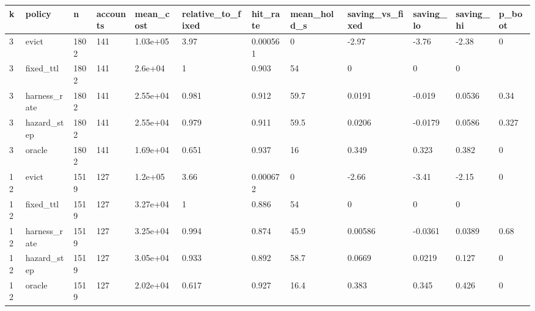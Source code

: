 \begin{tabular}{llllllllllll}
\toprule
k & policy & n & accounts & mean\_cost & relative\_to\_fixed & hit\_rate & mean\_hold\_s & saving\_vs\_fixed & saving\_lo & saving\_hi & p\_boot \\
\midrule
3 & evict & 1802 & 141 & 1.03e+05 & 3.97 & 0.000561 & 0 & -2.97 & -3.76 & -2.38 & 0 \\
3 & fixed\_ttl & 1802 & 141 & 2.6e+04 & 1 & 0.903 & 54 & 0 & 0 & 0 &  \\
3 & harness\_rate & 1802 & 141 & 2.55e+04 & 0.981 & 0.912 & 59.7 & 0.0191 & -0.019 & 0.0536 & 0.34 \\
3 & hazard\_step & 1802 & 141 & 2.55e+04 & 0.979 & 0.911 & 59.5 & 0.0206 & -0.0179 & 0.0586 & 0.327 \\
3 & oracle & 1802 & 141 & 1.69e+04 & 0.651 & 0.937 & 16 & 0.349 & 0.323 & 0.382 & 0 \\
12 & evict & 1519 & 127 & 1.2e+05 & 3.66 & 0.000672 & 0 & -2.66 & -3.41 & -2.15 & 0 \\
12 & fixed\_ttl & 1519 & 127 & 3.27e+04 & 1 & 0.886 & 54 & 0 & 0 & 0 &  \\
12 & harness\_rate & 1519 & 127 & 3.25e+04 & 0.994 & 0.874 & 45.9 & 0.00586 & -0.0361 & 0.0389 & 0.68 \\
12 & hazard\_step & 1519 & 127 & 3.05e+04 & 0.933 & 0.892 & 58.7 & 0.0669 & 0.0219 & 0.127 & 0 \\
12 & oracle & 1519 & 127 & 2.02e+04 & 0.617 & 0.927 & 16.4 & 0.383 & 0.345 & 0.426 & 0 \\
\bottomrule
\end{tabular}